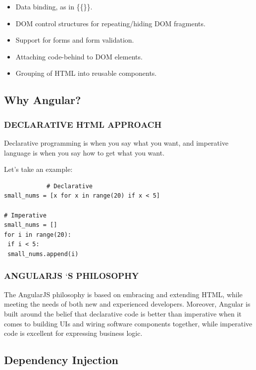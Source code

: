 \documentclass[14pt,a4paper]{extreport}
\begin{document}
\begin{itemize}
\item Data binding, as in \{\{\}\}.
\item DOM control structures for repeating/hiding DOM fragments.
\item Support for forms and form validation.
\item Attaching code-behind to DOM elements.
\item Grouping of HTML into reusable components.

\end{itemize}
		
		\subsection{Why Angular?}
			\subsubsection{DECLARATIVE HTML APPROACH}
			Declarative programming is when you say what you want, and imperative language is when you say how to get what you want. 

Let’s take an example:
			\begin{verbatim}
			# Declarative
small_nums = [x for x in range(20) if x < 5]

# Imperative
small_nums = []
for i in range(20):
 if i < 5:
 small_nums.append(i)
			\end{verbatim}
			\subsubsection{ANGULARJS $‘$S PHILOSOPHY}
The AngularJS philosophy is based on embracing and extending HTML, while meeting the needs of both new and experienced developers. Moreover, Angular is built around the belief that declarative code is better than imperative when it comes to building UIs and wiring software components together, while imperative code is excellent for expressing business logic.
			
		\subsection{Dependency Injection}
\end{document}
